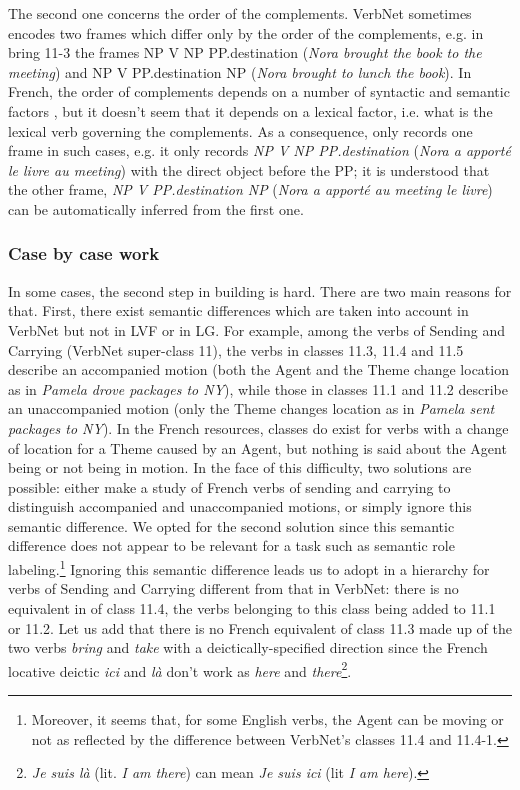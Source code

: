 The second one concerns the order of the complements. VerbNet sometimes encodes
two frames which differ only by the order of the complements, e.g. in bring
11-3 the frames NP V NP PP.destination (\emph{Nora brought the book to the
meeting}) and NP V PP.destination NP (\emph{Nora brought to lunch the book}).
In French, the order of complements  depends on a number of syntactic and
semantic factors \citep{thuilier2012contraintes}, but it doesn't seem that
it depends on a lexical factor, i.e. what is the lexical verb governing the
complements. As a consequence, \verbenet{} only records one frame in such
cases, e.g. it only records \emph{NP V NP PP.destination} (\emph{Nora a
apporté le livre au meeting}) with the direct object before the PP; it is
understood that the other frame, \emph{NP V  PP.destination NP} (\emph{Nora a
apporté au meeting le livre}) can be automatically inferred from the first
one.

\subsubsection{Case by case work}\label{durty}

In some cases, the second step in building \verbenet{} is hard. There are two
main reasons for that. First, there exist semantic differences which are taken
into account in VerbNet but not in LVF or in LG. For example, among the verbs
of Sending and Carrying (VerbNet super-class 11), the verbs in  classes 11.3,
11.4 and 11.5 describe an accompanied motion (both the Agent and the Theme
change location as in \emph{Pamela drove packages to NY}), while those in
classes 11.1 and 11.2 describe an unaccompanied motion (only the Theme changes
location as in \emph{Pamela sent packages to NY}). In the French resources,
classes do exist for verbs with a change of location for a Theme caused by an
Agent, but nothing is said about the Agent being or not being in motion.  In
the face  of this difficulty, two solutions are possible: either make a study
of French verbs of sending and carrying to distinguish accompanied and
unaccompanied motions, or simply ignore this semantic difference. We opted for
the second solution since this semantic difference does not appear to be
relevant for a task such as semantic role labeling.\footnote{Moreover, it seems
that, for some English verbs, the Agent can be moving or not as reflected by
the difference between VerbNet's classes 11.4 and 11.4-1.} Ignoring this
semantic difference leads us to adopt in \verbenet{} a hierarchy for verbs of
Sending and Carrying different from that in VerbNet: there is no equivalent in
\verbenet{} of  class 11.4, the verbs belonging to this class being added to
11.1 or 11.2. Let us add that there is no French equivalent of class 11.3 made
up of the two verbs \emph{bring} and \emph{take} with a deictically-specified
direction \citep[page 135]{levin1993english} since the French locative
deictic \emph{ici} and \emph{là} don't work as \emph{here} and
\emph{there}\footnote{\emph{Je suis là} (lit. \emph{I am there}) can mean
\emph{Je suis ici} (lit \emph{I am here}).}.

